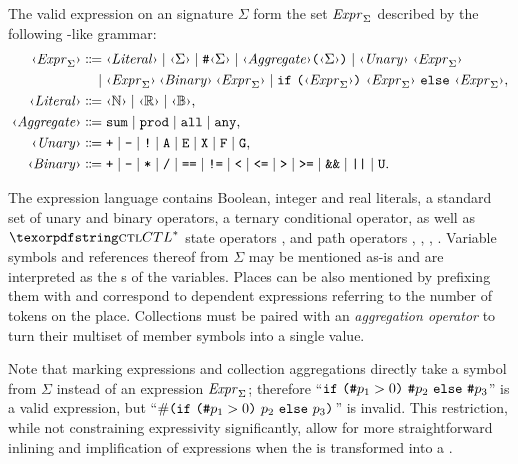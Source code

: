 The valid expression on an  signature \(\Sigma\) form the set \(\textrm{\itshape Expr\/}_\Sigma\) described by the following -like grammar:
\begin{equation}
  \label{eq:rgspn:expression}
  \begin{aligned}
    \ebnfV{\Expr_\Sigma} &\ebnfEq \ebnfVar{Literal} 
    \mid \ebnfV{\Sigma} \mid \lit\# \ebnfV{\Sigma} \mid \ebnfVar{Aggregate} \lit( \ebnfV{\Sigma} \lit)
    \mid \ebnfVar{Unary}\; \ebnfV{\Expr_\Sigma} \\*
    &\ebnfCont \ebnfV{\Expr_\Sigma} \mathbin{\ebnfVar{Binary}} \ebnfV{\Expr_\Sigma}
    \mid \lit{if}\ \lit(\ebnfV{\Expr_\Sigma}\lit)\ \ebnfV{\Expr_\Sigma}\ \lit{else}\ \ebnfV{\Expr_\Sigma} \text, \\
    \ebnfVar{Literal} &\ebnfEq \ebnfV{\NN} \mid \ebnfV{\RR} \mid \ebnfV{\BB} \text, \\
    \ebnfVar{Aggregate} &\ebnfEq \lit{sum} \mid \lit{prod}
    \mid \lit{all} \mid \lit{any} \text, \\  
    \ebnfVar{Unary} &\ebnfEq \lit{+} \mid \lit{-} \mid \lit{!} \mid \lit{A} \mid \lit{E} \mid \lit{X}  \mid \lit{F} \mid \lit{G} \text, \\
    \ebnfVar{Binary} &\ebnfEq \lit{+} \mid \lit{-} \mid \lit{*} \mid \lit{/}
    \mid \lit{==} \mid \lit{!=} \mid \lit{<} \mid \lit{<=} \mid \lit{>} \mid \lit{>=}
    \mid \lit{\&\&} \mid \lit{||} \mid \lit{U} \text.
  \end{aligned}
\end{equation}

The expression language contains Boolean, integer and real literals, a standard set of unary and binary operators, a ternary conditional operator, as well as \(\textabbr{CTL}^*\) state operators ,  and path operators , , , . Variable symbols and references thereof from \(\Sigma\) may be mentioned as-is and are interpreted as the s of the variables. Places can be also mentioned by prefixing them with \lit{\#} and correspond to  dependent expressions referring to the number of tokens on the place. Collections must be paired with an \emph{aggregation operator} to turn their multiset of member symbols into a single value.

Note that marking expressions and collection aggregations directly take a symbol from \(\Sigma\) instead of an expression \(\textrm{\itshape Expr\/}_\Sigma\); therefore \enquote{\(\lit{if}\ \lit(\lit\#p_1 > 0\lit)\ \lit\#p_2\ \lit{else}\ \lit\#p_3\)} is a valid expression, but \enquote{\(\#\lit(\lit{if}\ \lit(\lit\#p_1 > 0\lit)\ p_2\ \lit{else}\ p_3\lit)\)} is invalid. This restriction, while not constraining expressivity significantly, allow for more straightforward inlining and implification of expressions when the  is transformed into a .

